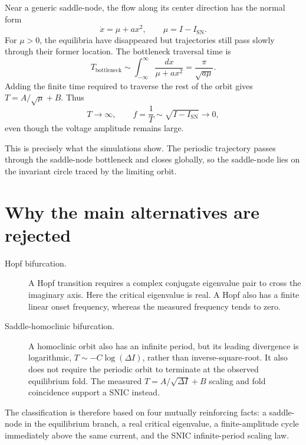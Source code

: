 \documentclass[11pt]{article}
\begin{document}
Near a generic saddle-node, the flow along its center direction has the normal
form
\begin{equation}
\dot{x}=\mu+a x^2,
\qquad
\mu=I-I_{\mathrm{SN}}.
\end{equation}
For $\mu>0$, the equilibria have disappeared but trajectories still pass
slowly through their former location. The bottleneck traversal time is
\begin{equation}
T_{\mathrm{bottleneck}}
\sim
\int_{-\infty}^{\infty}\frac{dx}{\mu+a x^2}
=\frac{\pi}{\sqrt{a\mu}}.
\end{equation}
Adding the finite time required to traverse the rest of the orbit gives
$T=A/\sqrt{\mu}+B$. Thus
\begin{equation}
T\longrightarrow\infty,
\qquad
f=\frac{1}{T}\sim\sqrt{I-I_{\mathrm{SN}}}\longrightarrow0,
\end{equation}
even though the voltage amplitude remains large.

This is precisely what the simulations show. The periodic trajectory passes
through the saddle-node bottleneck and closes globally, so the saddle-node lies
on the invariant circle traced by the limiting orbit.

\section{Why the main alternatives are rejected}

\begin{description}
\item[Hopf bifurcation.]
A Hopf transition requires a complex conjugate eigenvalue pair to cross the
imaginary axis. Here the critical eigenvalue is real. A Hopf also has a finite
linear onset frequency, whereas the measured frequency tends to zero.

\item[Saddle-homoclinic bifurcation.]
A homoclinic orbit also has an infinite period, but its leading divergence is
logarithmic, $T\sim-C\log(\Delta I)$, rather than inverse-square-root. It also
does not require the periodic orbit to terminate at the observed equilibrium
fold. The measured $T=A/\sqrt{\Delta I}+B$ scaling and fold coincidence support
a SNIC instead.
\end{description}

The classification is therefore based on four mutually reinforcing facts: a
saddle-node in the equilibrium branch, a real critical eigenvalue, a
finite-amplitude cycle immediately above the same current, and the SNIC
infinite-period scaling law.
\end{document}

